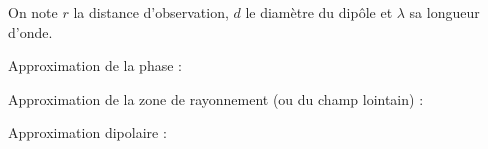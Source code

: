 ﻿\documentclass[a4paper]{article}
\begin{document}
\pagestyle{fancy}
\fancyhf{}
\setlength{\headheight}{15pt}

\begin{center}
	\large{}
\end{center}


On note \(r\) la distance d'observation, \(d\) le diamètre du dipôle et \(\lambda\) sa longueur d'onde.

Approximation de la phase :
\begin{center}
\end{center}

Approximation de la zone de rayonnement (ou du champ lointain) :
\begin{center}
\end{center}

Approximation dipolaire :
\begin{center}
\end{center}
\end{document}
